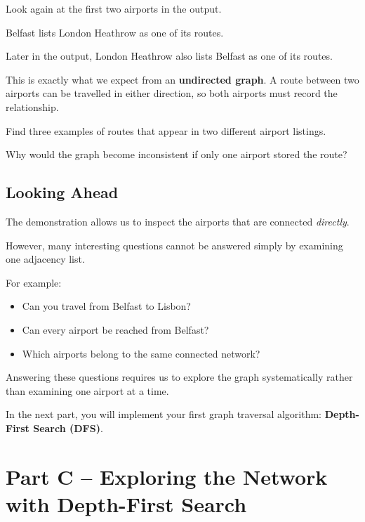 \documentclass{csc2059practical}
\begin{document}
Look again at the first two airports in the output.

Belfast lists London Heathrow as one of its routes.

Later in the output, London Heathrow also lists Belfast as one of its routes.

This is exactly what we expect from an \textbf{undirected graph}. A route
between two airports can be travelled in either direction, so both airports
must record the relationship.

\begin{reflectionbox}
Find three examples of routes that appear in two different airport listings.

Why would the graph become inconsistent if only one airport stored the route?
\end{reflectionbox}


\subsection{Looking Ahead}

The demonstration allows us to inspect the airports that are connected
\emph{directly}.

However, many interesting questions cannot be answered simply by examining one
adjacency list.

For example:

\begin{itemize}
    \item Can you travel from Belfast to Lisbon?
    \item Can every airport be reached from Belfast?
    \item Which airports belong to the same connected network?
\end{itemize}

Answering these questions requires us to explore the graph systematically rather
than examining one airport at a time.

In the next part, you will implement your first graph traversal algorithm:
\textbf{Depth-First Search (DFS)}.

\section{Part C -- Exploring the Network with Depth-First Search}
\end{document}
